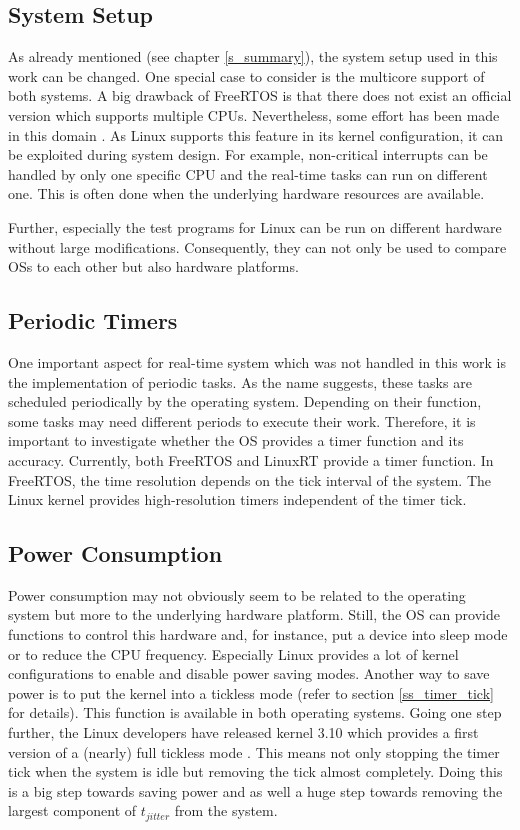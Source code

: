 \subsection{System Setup}
As already mentioned (see chapter \ref{s_summary}), the system setup used in this work can be changed.
One special case to consider is the multicore support of both systems.
A big drawback of FreeRTOS is that there does not exist an official version which supports multiple \acp{CPU}.
Nevertheless, some effort has been made in this domain \cite{mistry:affmaer}.
As Linux supports this feature in its kernel configuration, it can be exploited during system design.
For example, non-critical interrupts can be handled by only one specific \ac{CPU} and the real-time tasks can run on different one.
This is often done when the underlying hardware resources are available. 
\par
Further, especially the test programs for Linux can be run on different hardware without large modifications.
Consequently, they can not only be used to compare \acp{OS} to each other but also hardware platforms.

\subsection{Periodic Timers}
One important aspect for real-time system which was not handled in this work is the implementation of periodic tasks.
As the name suggests, these tasks are scheduled periodically by the operating system.
Depending on their function, some tasks may need different periods to execute their work.
Therefore, it is important to investigate whether the \ac{OS} provides a timer function and its accuracy.
Currently, both FreeRTOS and LinuxRT provide a timer function.
In FreeRTOS, the time resolution depends on the tick interval of the system.
The Linux kernel provides high-resolution timers independent of the timer tick.

\subsection{Power Consumption}
Power consumption may not obviously seem to be related to the operating system but more to the underlying hardware platform.
Still, the \ac{OS} can provide functions to control this hardware and, for instance, put a device into sleep mode or to reduce the \ac{CPU} frequency.
Especially Linux provides a lot of kernel configurations to enable and disable power saving modes.
Another way to save power is to put the kernel into a tickless mode (refer to section \ref{ss_timer_tick} for details).
This function is available in both operating systems.
Going one step further, the Linux developers have released kernel 3.10 which provides a first version of a (nearly) full tickless mode \cite{corbet:nftoi}.
This means not only stopping the timer tick when the system is idle but removing the tick almost completely. 
Doing this is a big step towards saving power and as well a huge step towards removing the largest component of $t_{jitter}$ from the system.

